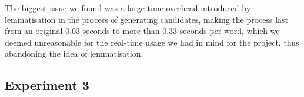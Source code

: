 The biggest issue we found was a large time overhead introduced by lemmatisation in the process of generating 
candidates, making the process last from an original \num{0,03} seconds to more than \num{0,33} seconds per word, which 
we deemed unreasonable for the real-time usage we had in mind for the project, thus abandoning the idea of 
lemmatisation.


%


\subsection{Experiment 3}

